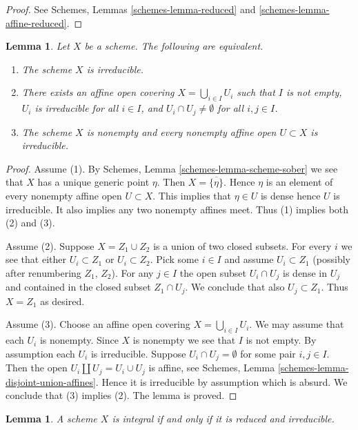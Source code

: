\documentclass{stacks-project}
\theoremstyle{plain}
\newtheorem{lemma}[subsection]{Lemma}
\theoremstyle{definition}
\theoremstyle{remark}
\numberwithin{equation}{subsection}
\begin{document}
\begin{proof}
See Schemes, Lemmas \ref{schemes-lemma-reduced} and
\ref{schemes-lemma-affine-reduced}.
\end{proof}

\begin{lemma}
\label{lemma-characterize-irreducible}
Let $X$ be a scheme.
The following are equivalent.
\begin{enumerate}
\item The scheme $X$ is irreducible.
\item There exists an affine open covering $X = \bigcup_{i \in I} U_i$
such that $I$ is not empty, $U_i$ is irreducible for all $i \in I$, and
$U_i \cap U_j \not = \emptyset$ for all $i, j \in I$.
\item The scheme $X$ is nonempty and every nonempty affine open
$U \subset X$ is irreducible.
\end{enumerate}
\end{lemma}

\begin{proof}
Assume (1). By Schemes, Lemma \ref{schemes-lemma-scheme-sober}
we see that $X$ has a unique generic point $\eta$. Then
$X = \overline{\{\eta\}}$. Hence $\eta$ is an element of
every nonempty affine open $U \subset X$. This implies
that $\eta \in U$ is dense hence $U$ is irreducible.
It also implies any two nonempty affines meet.
Thus (1) implies both (2) and (3).

\medskip\noindent
Assume (2). Suppose $X = Z_1 \cup Z_2$ is a union of two closed subsets.
For every $i$ we see that either $U_i \subset Z_1$ or $U_i \subset Z_2$.
Pick some $i \in I$ and assume $U_i \subset Z_1$ (possibly after renumbering
$Z_1$, $Z_2$). For any $j \in I$ the open subset $U_i \cap U_j$ is dense in
$U_j$ and contained in the closed subset $Z_1 \cap U_j$. We conclude that
also $U_j \subset Z_1$. Thus $X = Z_1$ as desired.

\medskip\noindent
Assume (3). Choose an affine open covering $X = \bigcup_{i \in I} U_i$.
We may assume that each $U_i$ is nonempty.
Since $X$ is nonempty we see that $I$ is not empty.
By assumption each $U_i$ is irreducible.
Suppose $U_i \cap U_j = \emptyset$ for some pair $i, j \in I$.
Then the open $U_i \amalg  U_j = U_i \cup U_j$ is affine, see
Schemes, Lemma \ref{schemes-lemma-disjoint-union-affines}.
Hence it is irreducible by assumption which is absurd. We conclude that (3)
implies (2). The lemma is proved.
\end{proof}

\begin{lemma}
\label{lemma-characterize-integral}
A scheme $X$ is integral if and only if it is reduced and irreducible.
\end{lemma}
\end{document}
